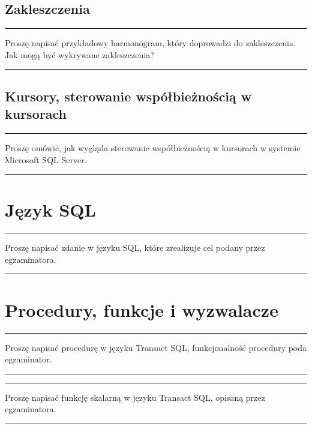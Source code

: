 \documentclass[a5paper,6pt]{article}
\newcommand{\horrule}[1]{\rule{\linewidth}{#1}}
\begin{document}

    \subsection{Zakleszczenia} %
    \label{sub:zakleszczenia}

    \horrule{0.5pt}
    Proszę napisać przykładowy harmonogram, który doprowadzi do zakleszczenia.
    Jak mogą być wykrywane zakleszczenia?\\
    \horrule{0.5pt}


    \subsection{Kursory, sterowanie współbieżnością w kursorach} %
    \label{sub:kursory_sterowanie_wspolbieznoscia_w_kursorach}

    \horrule{0.5pt}
    Proszę omówić, jak wygląda sterowanie współbieżnością w kursorach w systemie
    Microsoft SQL Server.\\
    \horrule{0.5pt}



    \section{Język SQL} %
    \label{sec:jezyk_sql}

    \horrule{0.5pt}
    Proszę napisać zdanie w języku SQL, które zrealizuje cel podany przez egzaminatora.\\
    \horrule{0.5pt}



    \section{Procedury, funkcje i wyzwalacze} %
    \label{sec:procedury_funkcje_i_wyzwalacze}

    \horrule{0.5pt}
    Proszę napisać procedurę w języku Transact SQL, funkcjonalność procedury
    poda egzaminator.\\
    \horrule{0.5pt}

    \horrule{0.5pt}
    Proszę napisać funkcję skalarną w języku Transact SQL, opisaną przez egzaminatora.\\
    \horrule{0.5pt}
\end{document}
